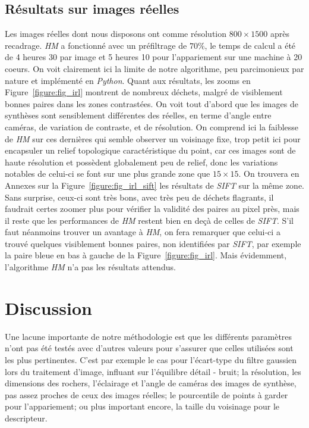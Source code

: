 \documentclass[
	a4paper, %
	10pt, %
	unnumberedsections, %
	twoside, %
]{LTJournalArticle}
\begin{document}
\subsection{Résultats sur images réelles}
Les images réelles dont nous disposons ont comme résolution $800 \times 1500$ après recadrage. \textit{HM} a fonctionné
avec un préfiltrage de $70 \%$, le temps de calcul a été de 4 heures 30 par image et 5 heures 10 pour l'appariement sur une machine à 20 coeurs.
On voit clairement ici la limite de notre algorithme, peu parcimonieux par nature et implémenté en \textit{Python}.
Quant aux résultats, les zooms en Figure~\ref{figure:fig_irl} montrent de nombreux déchets, malgré de visiblement
bonnes paires dans les zones contrastées.
On voit tout d'abord que les images de synthèses sont sensiblement différentes des réelles,
en terme d'angle entre caméras, de variation de contraste, et de résolution.
On comprend ici la faiblesse de \textit{HM} sur ces dernières qui semble observer un voisinage fixe,
trop petit ici pour encapsuler un relief topologique caractéristique du point,
car ces images sont de haute résolution et possèdent globalement peu de relief, donc les
variations notables de celui-ci se font sur une plus grande zone que $15 \times 15$.
On trouvera en Annexes sur la Figure~\ref{figure:fig_irl_sift} les résultats de \textit{SIFT} sur la même zone.
Sans surprise, ceux-ci sont très bons, avec très peu de déchets flagrants, il faudrait certes zoomer plus
pour vérifier la validité des paires au pixel près, mais il reste que les performances de \textit{HM}
restent bien en deçà de celles de \textit{SIFT}. S'il faut néanmoins trouver un avantage à \textit{HM}, on fera
remarquer que celui-ci a trouvé quelques visiblement bonnes paires, non identifiées par \textit{SIFT}, par
exemple la paire bleue en bas à gauche de la Figure~\ref{figure:fig_irl}.
Mais évidemment, l'algorithme \textit{HM} n'a pas les résultats attendus.



\section{Discussion}

Une lacune importante de notre méthodologie est que les différents paramètres
n'ont pas été testés avec d'autres valeurs pour s'assurer que celles
utilisées sont les plus pertinentes.
C'est par exemple le cas pour l'écart-type du filtre gaussien
lors du traitement d'image, influant sur l'équilibre détail - bruit;
la résolution, les dimensions des rochers, l'éclairage et l'angle de caméras des images de synthèse,
pas assez proches de ceux des images réelles;
le pourcentile de points à garder pour l'appariement;
ou plus important encore, la taille du voisinage pour le descripteur.\\
\end{document}
